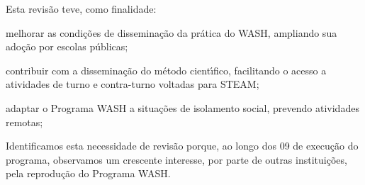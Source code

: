 \documentclass[
12pt,		%
openright,	%
twoside,  %
a4paper,			%
chapter=TITLE,		%
english,			%
french,				%
spanish,			%
brazil				%
]{USPSC-classe/USPSC}
\begin{document}
Esta revis\~ao teve, como finalidade:


















\begin{alineas}
\item melhorar as condi\c{c}\~oes de dissemina\c{c}\~ao da pr\'atica do WASH, ampliando sua ado\c{c}\~ao por escolas p\'ublicas;
\item contribuir com a dissemina\c{c}\~ao do m\'etodo cient\'{\i}fico, facilitando o acesso a atividades de turno e contra-turno voltadas para STEAM;
\item adaptar o Programa WASH a situa\c{c}\~oes de isolamento social, prevendo atividades remotas;
\end{alineas}

Identificamos esta necessidade de revis\~ao porque, ao longo dos 09 de execu\c{c}\~ao do programa, observamos um crescente interesse, por parte de outras institui\c{c}\~oes, pela reprodu\c{c}\~ao do Programa WASH.
\end{document}
